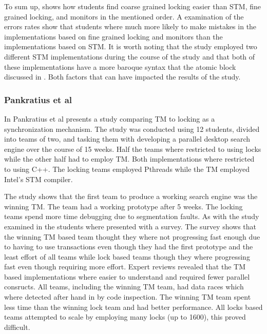 To sum up, \cite{rossbach2010transactional} shows how students find coarse grained locking easier than \ac{STM}, fine grained locking, and monitors in the mentioned order\cite[p. 54]{rossbach2010transactional}. A examination of the errors rates show that students where much more likely to make mistakes in the implementations based on fine grained locking and monitors than the implementations based on \ac{STM}\cite[p. 54]{rossbach2010transactional}. It is worth noting that the study employed two different \ac{STM} implementations during the course of the study and that both of these implementations have a more baroque syntax that the atomic block discussed in \cite[p. 49]{rossbach2010transactional}. Both factors that can have impacted the results of the study.

\subsubsection{Pankratius et al}
\label{sec:stm_ease_pankratius}
In \cite{pankratius2009does} Pankratius et al presents a study comparing \ac{TM} to locking as a synchronization mechanism. The study was conducted using 12 students, divided into teams of two, and tasking them with developing a parallel desktop search engine over the course of 15 weeks. Half the teams where restricted to using locks while the other half had to employ \ac{TM}. Both implementations where restricted to using C++. The locking teams employed Pthreads\cite[p. 2]{pankratius2009does} while the \ac{TM} employed Intel’s STM compiler\cite[p. 3]{pankratius2009does}.

The study shows that the first team to produce a working search engine was the winning \ac{TM}\cite[p. 6]{pankratius2009does}. The team had a working prototype after 5 weeks.   The locking teams spend more time debugging due to segmentation faults\cite[p. 6]{pankratius2009does}. As with the study examined in  the students where presented with a survey. The survey shows that the  winning \ac{TM} based team thought they where not progressing fast enough due to having to use transactions even though they had the first prototype and the least effort of all teams while lock based teams though they where progressing fast even though requiring more effort\cite[p. 6]{pankratius2009does}. Expert reviews revealed that the \ac{TM} based implementations where easier to understand and required fewer parallel consructs\cite[p. 6]{pankratius2009does}. All teams, including the winning \ac{TM} team, had data races which where detected after hand in by code inspection\cite[p. 6]{pankratius2009does}. The winning \ac{TM} team spent less time than the winning lock team and had better performance\cite[p. 23]{pankratius2009does}. All locks based teams attempted to scale by employing many locks (up to 1600),  this proved difficult\cite[p. 23]{pankratius2009does}.

